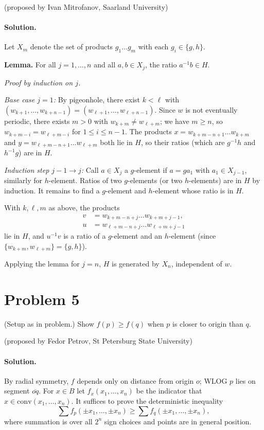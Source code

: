 \documentclass{article}
\begin{document}
(proposed by Ivan Mitrofanov, Saarland University)

\paragraph{Solution.}
Let $X_m$ denote the set of products $g_1 \ldots g_m$ with each $g_i \in \{g, h\}$.

\textbf{Lemma.} For all $j = 1, \ldots, n$ and all $a, b \in X_j$, the ratio $a^{-1} b \in H$.

\emph{Proof by induction on $j$.}

\emph{Base case $j = 1$:} By pigeonhole, there exist $k < \ell$ with $(w_{k+1}, \ldots, w_{k+n-1}) = (w_{\ell+1}, \ldots, w_{\ell+n-1})$. Since $w$ is not eventually periodic, there exists $m > 0$ with $w_{k+m} \neq w_{\ell+m}$; we have $m \geq n$, so $w_{k+m-i} = w_{\ell+m-i}$ for $1 \leq i \leq n-1$. The products $x = w_{k+m-n+1} \ldots w_{k+m}$ and $y = w_{\ell+m-n+1} \ldots w_{\ell+m}$ both lie in $H$, so their ratios (which are $g^{-1}h$ and $h^{-1}g$) are in $H$.

\emph{Induction step $j-1 \to j$:} Call $a \in X_j$ a $g$-element if $a = g a_1$ with $a_1 \in X_{j-1}$, similarly for $h$-element. Ratios of two $g$-elements (or two $h$-elements) are in $H$ by induction. It remains to find a $g$-element and $h$-element whose ratio is in $H$.

With $k, \ell, m$ as above, the products
\begin{align*}
v &= w_{k+m-n+j} \ldots w_{k+m+j-1}, \\
u &= w_{\ell+m-n+j} \ldots w_{\ell+m+j-1}
\end{align*}
lie in $H$, and $u^{-1}v$ is a ratio of a $g$-element and an $h$-element (since $\{w_{k+m}, w_{\ell+m}\} = \{g,h\}$).

Applying the lemma for $j = n$, $H$ is generated by $X_n$, independent of $w$.

\section*{Problem 5}
(Setup as in problem.) Show $f(p) \geq f(q)$ when $p$ is closer to origin than $q$.

(proposed by Fedor Petrov, St Petersburg State University)

\paragraph{Solution.}
By radial symmetry, $f$ depends only on distance from origin $o$; WLOG $p$ lies on segment $\overline{oq}$. For $x \in B$ let $f_x(x_1,\ldots,x_n)$ be the indicator that $x \in \mathrm{conv}(x_1, \ldots, x_n)$. It suffices to prove the deterministic inequality
\begin{equation}
\sum f_p(\pm x_1, \ldots, \pm x_n) \geq \sum f_q(\pm x_1, \ldots, \pm x_n), \tag{1}
\end{equation}
where summation is over all $2^n$ sign choices and points are in general position.
\end{document}
